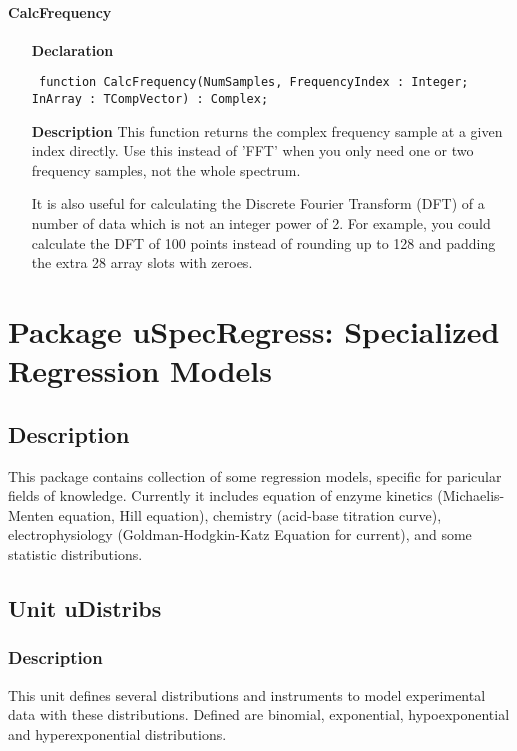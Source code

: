 \documentclass[12pt,a4paper,oneside]{report}
\newcommand{\lmath}[1]{   %
	\marginpar{\vspace{#1} 
		\begin{flushright}
			LMath
	\end{flushright} }
}
\newcommand{\declarationitem}[1]{\textbf{#1}}
\newcommand{\descriptiontitle}[1]{\textbf{#1}}
\newcommand{\code}[1]{\texttt{#1}}
\begin{document}
\subsubsection{CalcFrequency}
\label{ufft-CalcFrequency}
\begin{itemize}\item[\declarationitem{Declaration}\hfill]
	\begin{flushleft}
		\code{
			function CalcFrequency(NumSamples, FrequencyIndex : Integer; InArray : TCompVector) : Complex;}
		
	\end{flushleft}
	
	\par
	\item[\descriptiontitle{Description}]
	This function returns the complex frequency sample at a given index directly. Use this instead of 'FFT' when you only need one or two frequency samples, not the whole spectrum.
	
	It is also useful for calculating the Discrete Fourier Transform (DFT) of a number of data which is not an integer power of 2. For example, you could calculate the DFT of 100 points instead of rounding up to 128 and padding the extra 28 array slots with zeroes.
	
\end{itemize}
\chapter{Package uSpecRegress: Specialized Regression Models}\label{package-uspecregress}
\section{Description}
This package contains collection of some regression models, specific for paricular fields of knowledge. Currently it includes equation of enzyme kinetics (Michaelis-Menten equation, Hill equation), chemistry (acid-base titration curve), electrophysiology (Goldman-Hodgkin-Katz Equation for current), and some statistic distributions.
\section{Unit uDistribs}\lmath{-24pt}
\label{udistribs}
\subsection{Description}
This unit defines several distributions and instruments to model experimental data with these distributions. Defined are binomial, exponential, hypoexponential and hyperexponential distributions.
\end{document}
